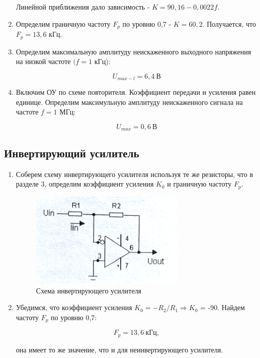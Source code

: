 \documentclass[a4paper, 12pt]{article}%
\begin{document}
\begin{enumerate}
Линейной приближения дало зависимость - $K = 90,16 - 0,0022f$.

\item Определим граничную частоту $F_p$ по уровню 0,7 - $K = 60,2$. Получается, что $F_p = 13,6$ кГц.

\item Определим максимальную амплитуду неискаженного выходного напряжения на низкой частоте $(f = 1$ кГц):

\[U_{max-l} = 6,4 \: \text{В}\]

\item Включим ОУ по схеме повторителя. Коэффициент передачи и усиления равен единице. Определим максимульную амплитуду неискаженного сигнала на частоте $f = 1$ МГц:

\[U_{max} = 0,6 \: \text{В}\]

\end{enumerate}

\newpage
\subsection{Инвертирующий усилитель}

\begin{enumerate}

\item Соберем схему инвертирующего усилителя используя те же резисторы, что в разделе 3, определим коэффициент усиления $K_0$ и граничную частоту $F_p$.

\begin{figure}[h]
\begin{center}
\includegraphics[width = 0.7\textwidth]{scheme3.png}
\caption{Схема инвертирующего усилителя}
\end{center}
\end{figure}

\item Убедимся, что коэффициент усиления $K_0 = -R_2 / R_1 \Rightarrow K_0$ = -90. Найдем частоту $F_p$ по уровню 0,7:

\[F_p = 13,6 \: \text{кГц},\]

она имеет то же значение, что и для неинвертирующего усилителя.

\end{enumerate}
\end{document}
